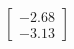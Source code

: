 \documentclass[preview]{standalone}
\begin{document}
\begin{align*}
\begin{bmatrix} -2.68 \\ -3.13 \end{bmatrix}
\end{align*}
\end{document}
